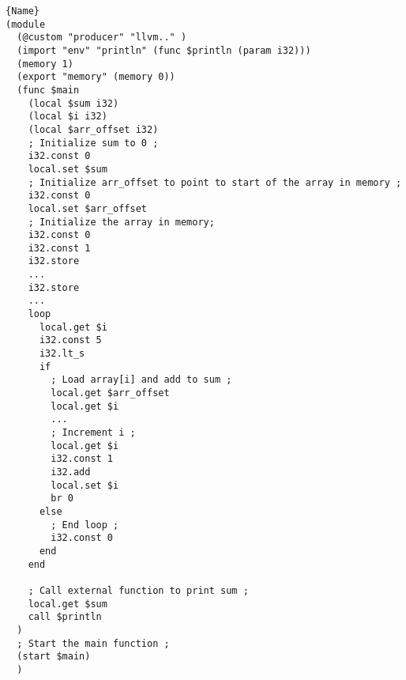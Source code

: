 
{
\captionsetup{width=0.9\linewidth}
    \begin{lstlisting}[label=example:wasmprogram,caption={Simplified WebAssembly code for Rust code in \autoref{example:cprogram}.}, captionpos=b]{Name}
(module
  (@custom "producer" "llvm.." )
  (import "env" "println" (func $println (param i32)))
  (memory 1)
  (export "memory" (memory 0))
  (func $main
    (local $sum i32)
    (local $i i32)
    (local $arr_offset i32)
    ; Initialize sum to 0 ;
    i32.const 0
    local.set $sum
    ; Initialize arr_offset to point to start of the array in memory ;
    i32.const 0
    local.set $arr_offset
    ; Initialize the array in memory;
    i32.const 0
    i32.const 1
    i32.store
    ...
    i32.store
    ...
    loop
      local.get $i
      i32.const 5
      i32.lt_s
      if
        ; Load array[i] and add to sum ;
        local.get $arr_offset
        local.get $i
        ...
        ; Increment i ;
        local.get $i
        i32.const 1
        i32.add
        local.set $i
        br 0
      else
        ; End loop ;
        i32.const 0
      end
    end
    
    ; Call external function to print sum ;
    local.get $sum
    call $println
  )
  ; Start the main function ;
  (start $main)
  )
\end{lstlisting}
}
